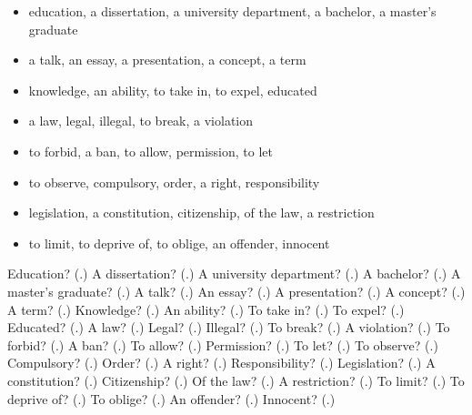 \begin{itemize}
\raggedright
  \item education, a dissertation, a university department, a bachelor, a master’s graduate
  \item a talk, an essay, a presentation, a concept, a term
  \item knowledge, an ability, to take in, to expel, educated
  \item a law, legal, illegal, to break, a violation
  \item to forbid, a ban, to allow, permission, to let
  \item to observe, compulsory, order, a right, responsibility
  \item legislation, a constitution, citizenship, of the law, a restriction
  \item to limit, to deprive of, to oblige, an offender, innocent
\end{itemize}

\begin{tcolorbox}[breakable,colback=teal!4,colframe=teal!35!black,title={Before you move on}]
Education? (\textbf{}.) A dissertation? (\textbf{}.) A university department? (\textbf{}.) A bachelor? (\textbf{}.) A master’s graduate? (\textbf{}.) A talk? (\textbf{}.) An essay? (\textbf{}.) A presentation? (\textbf{}.) A concept? (\textbf{}.) A term? (\textbf{}.) Knowledge? (\textbf{}.) An ability? (\textbf{}.) To take in? (\textbf{}.) To expel? (\textbf{}.) Educated? (\textbf{}.) A law? (\textbf{}.) Legal? (\textbf{}.) Illegal? (\textbf{}.) To break? (\textbf{}.) A violation? (\textbf{}.) To forbid? (\textbf{}.) A ban? (\textbf{}.) To allow? (\textbf{}.) Permission? (\textbf{}.) To let? (\textbf{}.) To observe? (\textbf{}.) Compulsory? (\textbf{}.) Order? (\textbf{}.) A right? (\textbf{}.) Responsibility? (\textbf{}.) Legislation? (\textbf{}.) A constitution? (\textbf{}.) Citizenship? (\textbf{}.) Of the law? (\textbf{}.) A restriction? (\textbf{}.) To limit? (\textbf{}.) To deprive of? (\textbf{}.) To oblige? (\textbf{}.) An offender? (\textbf{}.) Innocent? (\textbf{}.)
\end{tcolorbox}
